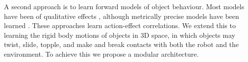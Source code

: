 A second approach is to learn forward models of object behaviour. Most models have been of qualitative effects \citep{montesano08,moldovan12,hermans11,fitzpatrick_learning_2003,ridge2010self,kroemer2014}, although metrically precise models have been learned \citep{mericli2014, scholz2010combining}. These approaches learn action-effect correlations. We extend this to learning the rigid body motions of objects in 3D space, in which objects may twist, slide, topple, and make and break contacts with both the robot and the environment. To achieve this we propose a modular architecture.
